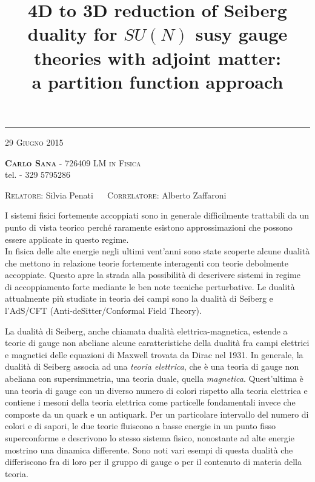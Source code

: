 \documentclass[a4paper,oneside,11pt]{article}
\date{}
\title{\boldmath \textbf{4D to 3D reduction of Seiberg duality for $SU(N)$ susy gauge theories with adjoint matter: \\  a partition function approach }
 }
\author{}
\begin{document}
\maketitle
\vspace*{-2.3cm}

\begin{center}
\rule{\textwidth}{0.5pt}
\scshape {29 Giugno 2015} \\
 \end{center}
\vspace{-0.3cm}
	 \textbf{\noindent%
	 \scshape%
	 Carlo Sana} - \textsf{726409}  \hfill
 {\scshape LM in Fisica} 
\\
 \noindent tel. \textsf{- 329 5795286}\\
 \vspace{-0.5cm}
\begin{center}
{ \scshape  Relatore}: 
\textsf{Silvia Penati} 
~~
{ \scshape  Correlatore}:
\textsf{Alberto Zaffaroni}

\end{center}

I sistemi fisici fortemente accoppiati sono in generale difficilmente trattabili da un punto di vista teorico perché raramente esistono approssimazioni che possono essere applicate in questo regime.\\
In fisica delle alte energie negli ultimi vent'anni sono state scoperte alcune dualità che mettono in relazione teorie fortemente interagenti con teorie debolmente accoppiate.
Questo apre la strada alla possibilità di descrivere sistemi in regime di accoppiamento forte mediante le ben note tecniche perturbative.
Le dualità attualmente più studiate in teoria dei campi sono la dualità di Seiberg e l'AdS/CFT (Anti-deSitter/Conformal Field Theory).

La dualità di Seiberg, anche chiamata dualità elettrica-magnetica, estende a teorie di gauge non abeliane alcune caratteristiche della dualità fra campi elettrici e magnetici delle equazioni di Maxwell trovata da Dirac nel 1931. 
In generale, la dualità di Seiberg associa ad una \emph{teoria elettrica}, che è una teoria di gauge non abeliana con supersimmetria, una teoria duale, quella \emph{magnetica}.
Quest'ultima è una teoria di gauge con un diverso numero di colori rispetto alla teoria elettrica e contiene i mesoni della teoria elettrica come particelle fondamentali invece che composte da un quark e un antiquark.
Per un particolare intervallo del numero di colori e di sapori, le due teorie fluiscono a basse energie in un punto fisso superconforme e descrivono lo stesso sistema fisico, nonostante ad alte energie mostrino una dinamica differente.
Sono noti vari esempi di questa dualità che differiscono fra di loro per il gruppo di gauge o per il contenuto di materia della teoria.
\end{document}
